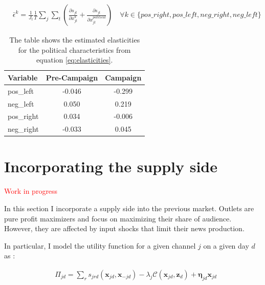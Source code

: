 \documentclass[12pt]{article}
\begin{document}
	\begin{equation}\label{eq:elasticities}
		\begin{aligned}
			& \bar{\epsilon}^k= \frac{1}{J_t}\frac{1}{T}\sum_{j}\sum_{t} \left(\frac{\partial s_{jt}}{\partial x_{jt}^k} +  \frac{\partial s_{jt}}{\partial x_{jt}^{political}} \right)\quad \forall k \in \{pos\_right,pos\_left,neg\_right,neg\_left\}
		\end{aligned}
	\end{equation}             
	
	
	
	
	\begin{table}[h!]
		\centering
		\begin{tabular}{|l|c|c|}
			\hline
			\textbf{Variable} & \textbf{Pre-Campaign} & \textbf{Campaign} \\
			\hline
			pos\_left & -0.046 & -0.299 \\
			neg\_left & 0.050 & 0.219 \\
			pos\_right & 0.034 & -0.006 \\
			neg\_right & -0.033 & 0.045 \\
			\hline
		\end{tabular}
		\caption{The table shows the estimated elasticities for the political characteristics from equation \ref{eq:elasticities}.}
		\label{tab:elasticities_comparison}
	\end{table}
	
	
	
	
	
	
	
	
	
	
	
	
	
	
	\section{Incorporating the supply side}
	
	\label{section:supply}
	
	
	\textcolor{red}{Work in progress}
	
	In this section I incorporate a supply side into the previous market. Outlets are pure profit maximizers and focus on maximizing their share of audience. However, they are affected by input shocks that limit their news production. 
	
	In particular, I model the utility function for a given channel $j$ on a given day $d$ as :
	
	\begin{equation}\label{}
		\begin{aligned}
			& \Pi_{jd }= \sum_{r}s_{jrd}(\bm{x}_{jd}, \bm{x}_{-jd}) - \lambda_j\mathcal{C}(\bm{x}_{jd}, \bm{z}_d)+ \bm{\eta}_{jd}\bm{x}_{jd}
		\end{aligned}
	\end{equation} 
	
\end{document}
